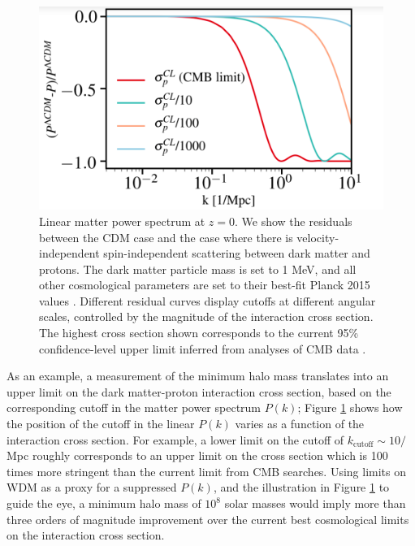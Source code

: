\begin{figure}
\centering
\includegraphics[width=0.6\columnwidth]{figures/dmbaryon_pk.png}
\caption{Linear matter power spectrum at $z=0$. We show the residuals between the CDM case and the case where there is velocity-independent spin-independent scattering between dark matter and protons. The dark matter particle mass is set to 1 MeV, and all other cosmological parameters are set to their best-fit Planck 2015 values \citep{Ade:2015xua}. Different residual curves display cutoffs at different angular scales, controlled by the magnitude of the interaction cross section. The highest cross section shown corresponds to the current 95\% confidence-level upper limit inferred from analyses of CMB data \citep{Gluscevic:2017ywp,Boddy:2018kfv}.
}
\label{fig:dmbaryon_pk}
\end{figure}
As an example, a measurement of the minimum halo mass translates into an upper limit on the dark matter-proton interaction cross section, based on the corresponding cutoff in the matter power spectrum $P(k)$; Figure \ref{fig:dmbaryon_pk} shows how the position of the cutoff in the linear $P(k)$ varies as a function of the interaction cross section. For example, a lower limit on the cutoff of $k_\text{cutoff}\sim 10/$Mpc roughly corresponds to an upper limit on the cross section which is 100 times more stringent than the current limit from CMB searches. Using limits on WDM as a proxy for a suppressed $P(k)$, and the illustration in Figure \ref{fig:dmbaryon_pk} to guide the eye, a minimum halo mass of $10^8$ solar masses would imply more than three orders of magnitude improvement over the current best cosmological limits on the interaction cross section.

